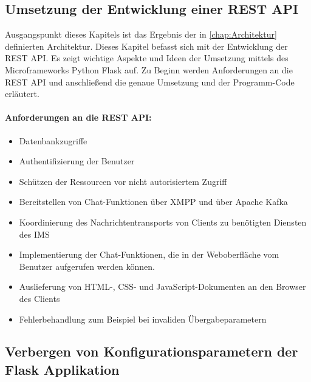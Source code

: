 \documentclass[a4paper,titlepage,halfparskip,12pt]{scrreprt}
\begin{document}
\begin{onehalfspacing}
\pagebreak

\chapter{Umsetzung der Entwicklung einer \acs{REST} \acs{API}}
\label{subsec:Backend}

Ausgangspunkt dieses Kapitels ist das Ergebnis der in \autoref{chap:Architektur} definierten Architektur. Dieses Kapitel befasst sich mit der Entwicklung der \acs{REST} \acs{API}. Es zeigt wichtige Aspekte und Ideen der Umsetzung mittels des Microframeworks Python Flask auf. Zu Beginn werden Anforderungen an die \acs{REST} \acs{API} und anschließend die genaue Umsetzung und der Programm-Code erläutert.

\subsubsection*{Anforderungen an die \acs{REST} \acs{API}:}

\begin{itemize}
\item Datenbankzugriffe
\item Authentifizierung der Benutzer
\item Schützen der Ressourcen vor nicht autorisiertem Zugriff
\item Bereitstellen von Chat-Funktionen über \ac{XMPP} und über Apache Kafka
\item Koordinierung des Nachrichtentransports von Clients zu benötigten Diensten des \ac{IMS}
\item Implementierung der Chat-Funktionen, die in der Weboberfläche vom Benutzer aufgerufen werden können.
\item Auslieferung von \ac{HTML}-, \ac{CSS}- und JavaScript-Dokumenten an den Browser des Clients
\item Fehlerbehandlung zum Beispiel bei invaliden Übergabeparametern
\end{itemize}


\section{Verbergen von Konfigurationsparametern der Flask Applikation}


\end{onehalfspacing}
\end{document}
